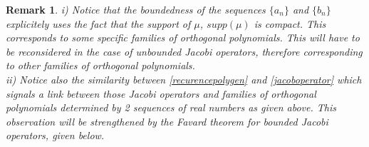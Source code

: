 \documentclass[a4paper]{jpconf}
\numberwithin{equation}{section}
\newtheorem{remark}[Theorem]{Remark}
\theoremstyle{nonumberplain}
\begin{document}
\begin{remark}
i) Notice that the boundedness of the sequences $\{a_n\}$ and $\{b_n\}$ explicitely uses the fact that the support of $\mu$, $supp(\mu)$ is compact. This corresponds to some specific families of orthogonal polynomials. This will have to be reconsidered in the case of unbounded Jacobi operators, therefore corresponding to other families of orthogonal polynomials.\\ ii) Notice also the similarity between \eqref{recurencepolygen} and \eqref{jacoboperator} which signals a link between those Jacobi operators and families of orthogonal polynomials determined by 2 sequences of real numbers as given above. This observation will be strengthened by the Favard theorem for bounded Jacobi operators, given below.
\end{remark}
\end{document}
